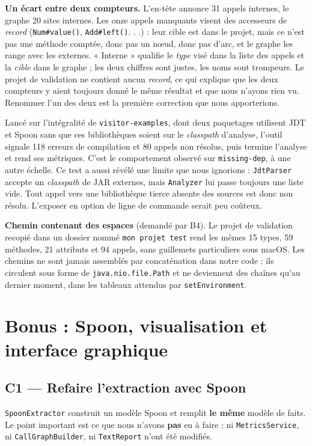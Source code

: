 \documentclass[11pt,a4paper]{article}
\begin{document}
\textbf{Un écart entre deux compteurs.} L'en-tête annonce 31 appels internes, le graphe 20 sites internes. Les onze appels manquants visent des accesseurs de \textit{record} (\texttt{Num\#value()}, \texttt{Add\#left()}. . .) : leur cible est dans le projet, mais ce n'est pas une méthode comptée, donc pas un n\oe{}ud, donc pas d'arc, et le graphe les range avec les externes. « Interne » qualifie le \textit{type} visé dans la liste des appels et la \textit{cible} dans le graphe ; les deux chiffres sont justes, les noms sont trompeurs. Le projet de validation ne contient aucun \textit{record}, ce qui explique que les deux compteurs y aient toujours donné le même résultat et que nous n'ayons rien vu. Renommer l'un des deux est la première correction que nous apporterions.

Lancé sur l'intégralité de \texttt{visitor-examples}, dont deux paquetages utilisent JDT et Spoon sans que ces bibliothèques soient sur le \textit{classpath} d'analyse, l'outil signale 118 erreurs de compilation et 80 appels non résolus, puis termine l'analyse et rend ses métriques. C'est le comportement observé sur \texttt{missing-dep}, à une autre échelle. Ce test a aussi révélé une limite que nous ignorions : \texttt{JdtParser} accepte un \textit{classpath} de JAR externes, mais \texttt{Analyzer} lui passe toujours une liste vide. Tout appel vers une bibliothèque tierce absente des sources est donc non résolu. L'exposer en option de ligne de commande serait peu coûteux.

\textbf{Chemin contenant des espaces} (demandé par B4). Le projet de validation recopié dans un dossier nommé \texttt{mon projet test} rend les mêmes 15 types, 59 méthodes, 21 attributs et 94 appels, sans guillemets particuliers sous macOS. Les chemins ne sont jamais assemblés par concaténation dans notre code : ils circulent sous forme de \texttt{java.nio.file.Path} et ne deviennent des chaînes qu'au dernier moment, dans les tableaux attendus par \texttt{setEnvironment}.

\section{Bonus : Spoon, visualisation et interface graphique}
\label{sec:bonus}

\subsection{C1 --- Refaire l'extraction avec Spoon}

\texttt{SpoonExtractor} construit un modèle Spoon et remplit \textbf{le même} modèle de faits. Le point important est ce que nous n'avons \textbf{pas} eu à faire : ni \texttt{MetricsService}, ni \texttt{CallGraphBuilder}, ni \texttt{TextReport} n'ont été modifiés.
\end{document}
